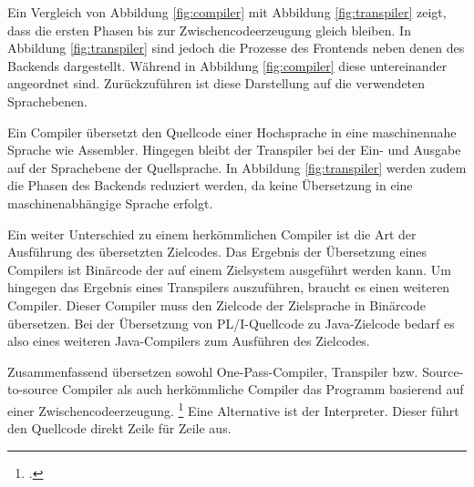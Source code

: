 Ein Vergleich von Abbildung \ref{fig:compiler} mit Abbildung \ref{fig:transpiler} zeigt, dass die ersten Phasen bis zur Zwischencodeerzeugung gleich bleiben. In Abbildung \ref{fig:transpiler} sind jedoch die Prozesse des Frontends neben denen des Backends dargestellt. Während in Abbildung \ref{fig:compiler} diese untereinander angeordnet sind. Zurückzuführen ist diese Darstellung auf die verwendeten Sprachebenen.

Ein Compiler übersetzt den Quellcode einer Hochsprache in eine maschinennahe Sprache wie Assembler. Hingegen bleibt der Transpiler bei der Ein- und Ausgabe auf der Sprachebene der Quellsprache. In Abbildung \ref{fig:transpiler} werden zudem die Phasen des Backends reduziert werden, da keine Übersetzung in eine maschinenabhängige Sprache erfolgt.

Ein weiter Unterschied zu einem herkömmlichen Compiler ist die Art der Ausführung des übersetzten Zielcodes.
Das Ergebnis der Übersetzung eines Compilers ist Binärcode der auf einem Zielsystem ausgeführt werden kann. Um hingegen das Ergebnis eines Transpilers auszuführen,
braucht es einen weiteren Compiler. Dieser Compiler muss den Zielcode der Zielsprache in Binärcode übersetzen.
Bei der Übersetzung von PL/I-Quellcode zu Java-Zielcode bedarf es also eines weiteren Java-Compilers zum Ausführen des Zielcodes.



Zusammenfassend übersetzen sowohl One-Pass-Compiler, Transpiler bzw. Source-to-source Compiler als auch herkömmliche Compiler das Programm basierend auf einer Zwischencodeerzeugung. \footcite[Vgl. ][S. 18ff. ]{assambly}
Eine Alternative ist der Interpreter. Dieser führt den Quellcode direkt Zeile für Zeile aus.

